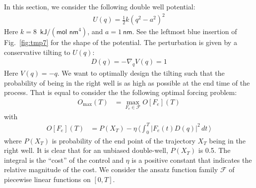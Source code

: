 \documentclass[]{tMPH2e}
\begin{document}
In this section, we consider the following double well potential:
\begin{align}
  U( q) = \frac12 k ( q^2 - a^2)^2
\end{align}
Here $k = 8$~$\textsf{kJ} / (\textsf{mol nm}^4)$, and $ a = 1\
\textsf{nm}$.  See the leftmost blue insertion of Fig.~\ref{fig:tmp7} for
the shape of the potential.
The perturbation is given by a conservative tilting to $U( q)$:
\begin{align}
   D( q) = -\nabla_{ q} V( q) = 1
\end{align}
Here $V( q) = - q$. We want to
optimally design the tilting such that the probability
of being in the right well is as high as possible 
at the end time of the process. That is equal to consider the 
the following optimal forcing problem:
\begin{align}
  O_{\max}(T)& = \max_{F_e\in\mathcal F} O[F_e](T) 
\end{align}
with
\begin{align}
  O[F_e](T) &= P( X_T) -
  \eta\,
  \big\langle \int_0^T\vert F_e(t) D( q)\vert^2\, dt\,
  \big\rangle
\end{align}
where $P( X_T)$ is probability of the end point of the trajectory
$ X_T$ being in the right well.  It is
clear that for an unbiased double-well, $P( X_T)$
is 0.5.  The integral is the ``cost'' of the control and $\eta$ is a
positive constant that indicates the relative magnitude of the
cost. We consider the ansatz function family $\mathcal F$ of piecewise
linear functions on $[0, T]$.
\end{document}

